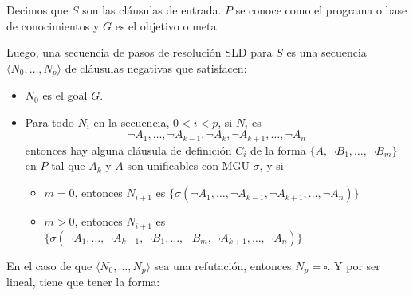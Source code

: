 Decimos que $S$ son las cláusulas de entrada. $P$ se conoce como el programa o base de conocimientos y $G$ es el objetivo o meta.

Luego, una secuencia de pasos de resolución SLD para $S$ es una secuencia $\langle N_0, \dots, N_p \rangle$ de cláusulas negativas que satisfacen:
\begin{itemize}
  \item $N_0$ es el goal $G$.
  \item Para todo $N_i$ en la secuencia, $0 < i < p$, si $N_i$ es
  \[\lnot A_1,\dots,\lnot A_{k-1},\lnot A_k,\lnot A_{k+1},\dots,\lnot A_n\]
  entonces hay alguna cláusula de definición $C_i$ de la forma $\{A, \lnot B_1,\dots, \lnot B_m\}$ en $P$ tal que $A_k$ y $A$ son unificables con MGU $\sigma$, y si
    \begin{itemize}
      \item $m = 0$, entonces $N_{i+1}$ es $\{\sigma(\lnot A_1,\dots,\lnot A_{k-1},\lnot A_{k+1},\dots,\lnot A_n)\}$
      \item $m > 0$, entonces $N_{i+1}$ es $\{\sigma(\lnot A_1,\dots,\lnot A_{k-1}, \lnot B_1,\dots, \lnot B_m, \lnot A_{k+1},\dots,\lnot A_n)\}$
    \end{itemize}
\end{itemize}

En el caso de que $\langle N_0, \dots, N_p \rangle$ sea una refutación, entonces $N_p = \square$. Y por ser lineal, tiene que tener la forma:

\begin{center}
\end{center}

